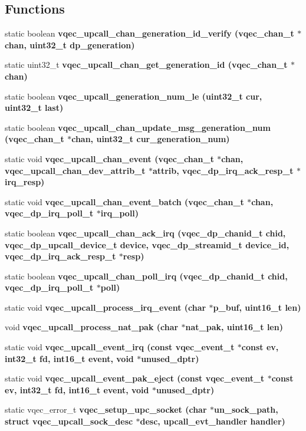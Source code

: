 \subsection*{Functions}
\begin{CompactItemize}
\item 
static boolean \bf{vqec\_\-upcall\_\-chan\_\-generation\_\-id\_\-verify} (\bf{vqec\_\-chan\_\-t} $\ast$chan, uint32\_\-t dp\_\-generation)
\item 
static uint32\_\-t \bf{vqec\_\-upcall\_\-chan\_\-get\_\-generation\_\-id} (\bf{vqec\_\-chan\_\-t} $\ast$chan)
\item 
static boolean \bf{vqec\_\-upcall\_\-generation\_\-num\_\-le} (uint32\_\-t cur, uint32\_\-t last)
\item 
static boolean \bf{vqec\_\-upcall\_\-chan\_\-update\_\-msg\_\-generation\_\-num} (\bf{vqec\_\-chan\_\-t} $\ast$chan, uint32\_\-t cur\_\-generation\_\-num)
\item 
static void \bf{vqec\_\-upcall\_\-chan\_\-event} (\bf{vqec\_\-chan\_\-t} $\ast$chan, \bf{vqec\_\-upcall\_\-chan\_\-dev\_\-attrib\_\-t} $\ast$attrib, vqec\_\-dp\_\-irq\_\-ack\_\-resp\_\-t $\ast$irq\_\-resp)
\item 
static void \bf{vqec\_\-upcall\_\-chan\_\-event\_\-batch} (\bf{vqec\_\-chan\_\-t} $\ast$chan, vqec\_\-dp\_\-irq\_\-poll\_\-t $\ast$irq\_\-poll)
\item 
static boolean \bf{vqec\_\-upcall\_\-chan\_\-ack\_\-irq} (vqec\_\-dp\_\-chanid\_\-t chid, vqec\_\-dp\_\-upcall\_\-device\_\-t device, vqec\_\-dp\_\-streamid\_\-t device\_\-id, vqec\_\-dp\_\-irq\_\-ack\_\-resp\_\-t $\ast$resp)
\item 
static boolean \bf{vqec\_\-upcall\_\-chan\_\-poll\_\-irq} (vqec\_\-dp\_\-chanid\_\-t chid, vqec\_\-dp\_\-irq\_\-poll\_\-t $\ast$poll)
\item 
static void \bf{vqec\_\-upcall\_\-process\_\-irq\_\-event} (char $\ast$p\_\-buf, uint16\_\-t len)
\item 
void \bf{vqec\_\-upcall\_\-process\_\-nat\_\-pak} (char $\ast$nat\_\-pak, uint16\_\-t len)
\item 
static void \bf{vqec\_\-upcall\_\-event\_\-irq} (const vqec\_\-event\_\-t $\ast$const ev, int32\_\-t fd, int16\_\-t event, void $\ast$unused\_\-dptr)
\item 
static void \bf{vqec\_\-upcall\_\-event\_\-pak\_\-eject} (const vqec\_\-event\_\-t $\ast$const ev, int32\_\-t fd, int16\_\-t event, void $\ast$unused\_\-dptr)
\item 
static vqec\_\-error\_\-t \bf{vqec\_\-setup\_\-upc\_\-socket} (char $\ast$un\_\-sock\_\-path, struct \bf{vqec\_\-upcall\_\-sock\_\-desc} $\ast$desc, \bf{upcall\_\-evt\_\-handler} handler)

\end{CompactItemize}
